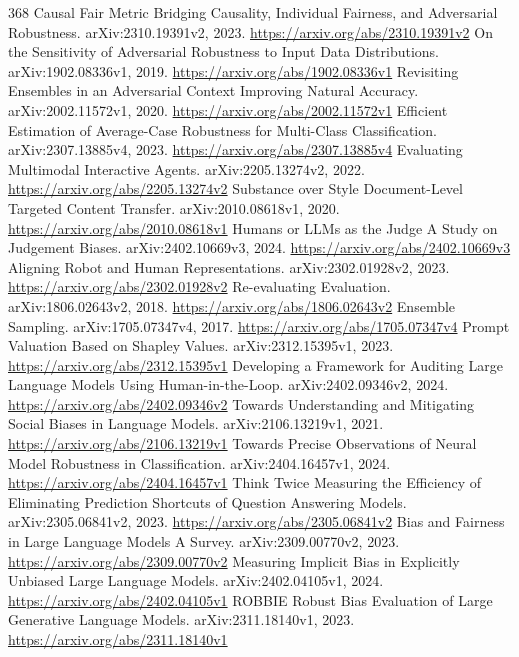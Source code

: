 \documentclass[11pt]{article}
\begin{document}
\begin{thebibliography}{368}
 Causal Fair Metric Bridging Causality, Individual Fairness, and Adversarial Robustness. arXiv:2310.19391v2, 2023. \url{https://arxiv.org/abs/2310.19391v2}
 On the Sensitivity of Adversarial Robustness to Input Data Distributions. arXiv:1902.08336v1, 2019. \url{https://arxiv.org/abs/1902.08336v1}
 Revisiting Ensembles in an Adversarial Context Improving Natural Accuracy. arXiv:2002.11572v1, 2020. \url{https://arxiv.org/abs/2002.11572v1}
 Efficient Estimation of Average-Case Robustness for Multi-Class Classification. arXiv:2307.13885v4, 2023. \url{https://arxiv.org/abs/2307.13885v4}
 Evaluating Multimodal Interactive Agents. arXiv:2205.13274v2, 2022. \url{https://arxiv.org/abs/2205.13274v2}
 Substance over Style Document-Level Targeted Content Transfer. arXiv:2010.08618v1, 2020. \url{https://arxiv.org/abs/2010.08618v1}
 Humans or LLMs as the Judge A Study on Judgement Biases. arXiv:2402.10669v3, 2024. \url{https://arxiv.org/abs/2402.10669v3}
 Aligning Robot and Human Representations. arXiv:2302.01928v2, 2023. \url{https://arxiv.org/abs/2302.01928v2}
 Re-evaluating Evaluation. arXiv:1806.02643v2, 2018. \url{https://arxiv.org/abs/1806.02643v2}
 Ensemble Sampling. arXiv:1705.07347v4, 2017. \url{https://arxiv.org/abs/1705.07347v4}
 Prompt Valuation Based on Shapley Values. arXiv:2312.15395v1, 2023. \url{https://arxiv.org/abs/2312.15395v1}
 Developing a Framework for Auditing Large Language Models Using Human-in-the-Loop. arXiv:2402.09346v2, 2024. \url{https://arxiv.org/abs/2402.09346v2}
 Towards Understanding and Mitigating Social Biases in Language Models. arXiv:2106.13219v1, 2021. \url{https://arxiv.org/abs/2106.13219v1}
 Towards Precise Observations of Neural Model Robustness in Classification. arXiv:2404.16457v1, 2024. \url{https://arxiv.org/abs/2404.16457v1}
 Think Twice Measuring the Efficiency of Eliminating Prediction Shortcuts of Question Answering Models. arXiv:2305.06841v2, 2023. \url{https://arxiv.org/abs/2305.06841v2}
 Bias and Fairness in Large Language Models A Survey. arXiv:2309.00770v2, 2023. \url{https://arxiv.org/abs/2309.00770v2}
 Measuring Implicit Bias in Explicitly Unbiased Large Language Models. arXiv:2402.04105v1, 2024. \url{https://arxiv.org/abs/2402.04105v1}
 ROBBIE Robust Bias Evaluation of Large Generative Language Models. arXiv:2311.18140v1, 2023. \url{https://arxiv.org/abs/2311.18140v1}

\end{thebibliography}
\end{document}
